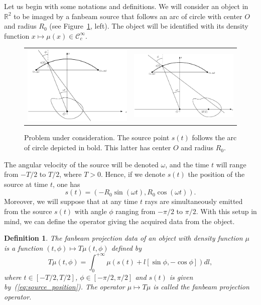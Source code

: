 \documentclass[a4paper]{article}
\numberwithin{equation}{section}
\newcommand{\R}{\mathbb{R}}
\newcommand{\Ccinf}{\mathcal{C}_c^{\infty}}
\newtheorem{definition}{Definition}
\begin{document}
Let us begin with some notations and definitions. We will consider an object in $\R^2$ to be imaged by a fanbeam source that follows an arc of circle with center $O$ and radius $R_0$ (see Figure~\ref{fig:notations}, left). The object will be identified with its density function $x \mapsto \mu(x) \in \Ccinf$.
\begin{figure}[!ht]
	\centering
	\begin{tabular}{cc}
	\includegraphics[width=8cm]{figs/frame_scanner_still.eps} &
	\includegraphics[width=8cm]{figs/frame_scanner.eps}
	\end{tabular}
	\caption{Problem under consideration. The source point $s(t)$ follows the arc of circle depicted in bold. This latter has center $O$ and radius $R_0$.\label{fig:notations}}
\end{figure}
The angular velocity of the source will be denoted $\omega$, and the time $t$ will range from $-T/2$ to $T/2$, where $T>0$. Hence, if we denote $s(t)$ the position of the source at time $t$, one has
\begin{equation}
	s(t) = \left( -R_0 \sin(\omega t), R_0 \cos(\omega t) \right).
\label{eq:source_position}
\end{equation}
Moreover, we will suppose that at any time $t$ rays are simultaneously emitted from the source $s(t)$ with angle $\phi$ ranging from $-\pi/2$ to $\pi/2$. With this setup in mind, we can define the operator giving the acquired data from the object.
\begin{definition}
The \emph{fanbeam projection data} of an object with density function $\mu$ is a function $(t,\phi) \mapsto T\mu(t,\phi)$ defined by
\begin{equation}
	T\mu(t,\phi) = \int_0^{+\infty} \mu \left( s(t) + l \left[ \sin \phi, -\cos \phi \right] \right) dl,
\end{equation}
where $t \in \left[ -T/2, T/2\right]$, $\phi \in \left[ -\pi/2, \pi/2\right]$ and $s(t)$ is given by~(\ref{eq:source_position}). The operator $\mu \mapsto T\mu$ is called the \emph{fanbeam projection operator}.
\end{definition}
\end{document}
